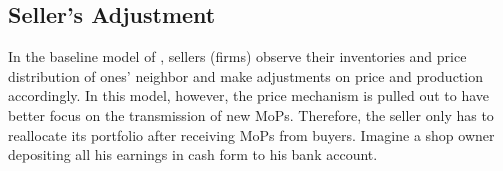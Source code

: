 \subsection{Seller's Adjustment}

In the baseline model of \citet*{HandbookABM}, sellers (firms) observe their
inventories and price distribution of ones' neighbor and make adjustments on
price and production accordingly. In this model, however, the price mechanism is pulled out
to have better focus on the transmission of new MoPs. Therefore, the seller only
has to reallocate its portfolio after receiving MoPs from buyers. Imagine a shop
owner depositing all his earnings in cash form to his bank account.